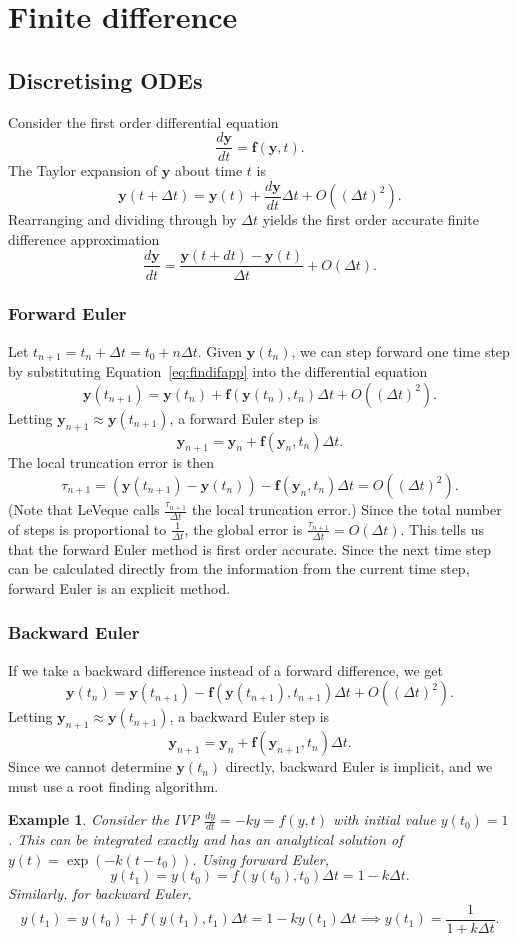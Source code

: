 \documentclass[11pt, a4paper]{article}
\theoremstyle{break}
\newtheorem{eg}[thm]{Example}
\newcommand{\ve}{\mathbf} %
\newcommand{\dt}{\Delta t}
\newcommand{\dder}[2]{\frac{d #1}{d #2}}
\begin{document}
\section{Finite difference}
\subsection{Discretising ODEs}
Consider the first order differential equation \[\dder {\ve y}t=\ve f({\ve y},t).\]
The Taylor expansion of ${\ve y}$ about time $t$ is \[\ve y(t+\dt)=\ve y(t)+ \dder {\ve y}t\dt+O((\dt)^2).\] Rearranging and dividing through by $\dt$ yields the first order accurate finite difference approximation \begin{equation}\label{eq:findifapp}\dder{\ve y}t=\frac{{\ve y}(t+dt)-{\ve y}(t)}{\dt} + O(\dt).\end{equation}
\subsubsection{Forward Euler}
Let $t_{n+1}=t_n+\dt=t_0+n\dt$. Given $\ve y(t_n)$, we can step forward one time step by substituting Equation~\ref{eq:findifapp} into the differential equation \[\ve y(t_{n+1})=\ve y(t_n)+\ve f(\ve y(t_n),t_n)\dt +O((\dt)^2).\]
Letting $\ve y_{n+1}\approx \ve y(t_{n+1})$, a forward Euler step is \[\ve y_{n+1}=\ve y_n + \ve f(\ve y_n,t_n)\dt.\]
The local truncation error is then \[\tau_{n+1}=({\ve y(t_{n+1})-\ve y(t_n)})-\ve f(\ve y_n,t_n)\dt=O((\dt)^2).\] (Note that LeVeque calls $\frac{\tau_{n+1}}{\dt}$ the local truncation error.) Since the total number of steps is proportional to $\frac1{\dt}$, the global error is $\frac{\tau_{n+1}}{\dt}=O(\dt)$. This tells us that the forward Euler method is first order accurate. Since the next time step can be calculated directly from the information from the current time step, forward Euler is an explicit method.

\subsubsection{Backward Euler}
If we take a backward difference instead of a forward difference, we get \[\ve y(t_n)=\ve y(t_{n+1})-\ve f(\ve y(t_{n+1}),t_{n+1})\dt +O((\dt)^2).\] Letting $\ve y_{n+1}\approx \ve y(t_{n+1})$, a backward Euler step is \[\ve y_{n+1}=\ve y_n + \ve f(\ve y_{n+1},t_n)\dt.\] Since we cannot determine $\ve y(t_n)$ directly, backward Euler is implicit, and we must use a root finding algorithm.

\begin{eg}
Consider the IVP $\dder yt=-ky=f(y,t)$ with initial value $y(t_0)=1$. This can be integrated exactly and has an analytical solution of $y(t)=\exp(-k(t-t_0))$. Using forward Euler, \[y(t_1)=y(t_0)=f(y(t_0),t_0)\dt=1-k\dt.\] Similarly, for backward Euler, \[y(t_1)=y(t_0)+f(y(t_1),t_1)\dt = 1-ky(t_1)\dt \implies y(t_1)=\frac1{1+k\dt}.\]
\end{eg}
\end{document}
